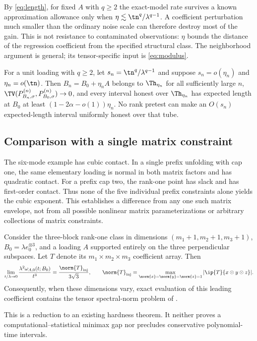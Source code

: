 By \eqref{eq:length}, for fixed $A$ with $q\ge2$ the exact-model rate survives a known approximation allowance only when $\eta\lesssim\tn^q/\lambda^{q-1}$. A coefficient perturbation much smaller than the ordinary noise scale can therefore destroy most of the gain. This is not resistance to contaminated observations: $\eta$ bounds the distance of the regression coefficient from the specified structural class. The neighborhood argument is general; its tensor-specific input is \eqref{eq:modulus}.

\begin{corollary}\label{cor:pretest}
For a unit loading with $q\ge2$, let $s_n=\tn^q/\lambda^{q-1}$ and suppose $s_n=o(\eta_n)$ and $\eta_n=o(\tn)$. Then $B_n=B_0+\eta_n A$ belongs to $\Th_{\eta_n}$ for all sufficiently large $n$, $\TV(P_{B_n,\sigma}^{(n)},P_{B_0,\sigma}^{(n)})\to0$, and every interval honest over $\Th_{\eta_n}$ has expected length at $B_0$ at least $(1-2\alpha-o(1))\eta_n$. No rank pretest can make an $O(s_n)$ expected-length interval uniformly honest over that tube.
\end{corollary}

\subsection{Comparison with a single matrix constraint}
The six-mode example has cubic contact. In a single prefix unfolding with cap one, the same elementary loading is normal in both matrix factors and has quadratic contact. For a prefix cap two, the rank-one point has slack and has first-order contact. Thus none of the five individual prefix constraints alone yields the cubic exponent. This establishes a difference from any one such matrix envelope, not from all possible nonlinear matrix parameterizations or arbitrary collections of matrix constraints.

\begin{proposition}\label{prop:hardness}
Consider the three-block rank-one class in dimensions $(m_1+1,m_2+1,m_3+1)$, $B_0=\lambda e_0^{\otimes3}$, and a loading $A$ supported entirely on the three perpendicular subspaces. Let $T$ denote its $m_1\times m_2\times m_3$ coefficient array. Then
\[
 \lim_{t/\lambda\to0}\frac{\lambda^2\omega_{A,0}(t;B_0)}{t^3}
 =\frac{\norm{T}_{\rm inj}}{3\sqrt3},\qquad
 \norm{T}_{\rm inj}=\max_{\norm{x}=\norm{y}=\norm{z}=1}|\ip{T}{x\otimes y\otimes z}|.
\]
Consequently, when these dimensions vary, exact evaluation of this leading coefficient contains the tensor spectral-norm problem of \citet{hillarlim2013}.
\end{proposition}
This is a reduction to an existing hardness theorem. It neither proves a computational--statistical minimax gap nor precludes conservative polynomial-time intervals.

